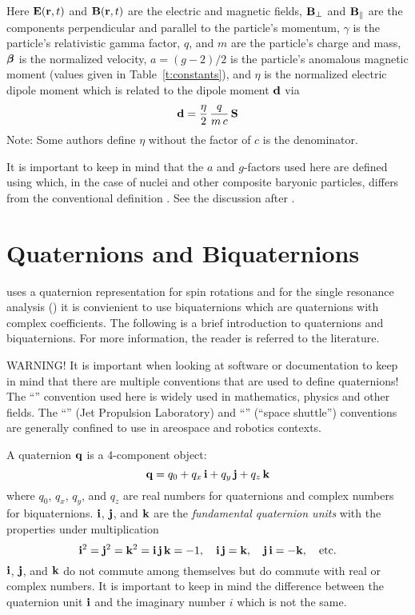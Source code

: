 Here ${\bf E} ({\bf r} ,t)$ and ${\bf B} ({\bf r} ,t)$ are the electric and magnetic fields, ${\bf B}_\perp$
and ${\bf B}_\parallel$ are the components perpendicular and parallel to the particle's momentum,
$\gamma$ is the particle's relativistic gamma factor, $q$, and $m$ are the particle's charge and
mass, $\boldsymbol{\beta}$ is the normalized velocity, $a = (g-2)/2$ is the particle's anomalous magnetic
moment (values given in Table~\ref{t:constants}), and $\eta$ is the normalized electric dipole
moment which is related to the dipole moment ${\bf d}$ via
\begin{equation}
  {\bf d} = \frac{\eta}{2} \, \frac{q}{m \, c} \, {\bf S}
\end{equation}
Note: Some authors define $\eta$ without the factor of $c$ is the denominator.

It is important to keep in mind that the $a$ and $g$-factors used here are defined using 
which, in the case of nuclei and other composite baryonic particles, differs from the conventional
definition . See the discussion after .

\section{Quaternions and Biquaternions}
\label{s:quat}

\bmad uses a quaternion representation for spin rotations\cite{b:quat} and for the single resonance
analysis () it is convienient to use biquaternions which are quaternions with
complex coefficients. The following is a brief introduction to quaternions and biquaternions. For
more information, the reader is referred to the literature\cite{b:biquat}.

WARNING! It is important when looking at software or documentation to keep in mind that there are
multiple conventions that are used to define quaternions! The ``'' convention used here
is widely used in mathematics, physics and other fields. The ``'' (Jet Propulsion
Laboratory) and ``'' (``space shuttle'') conventions are generally confined to use in
areospace and robotics contexts\cite{b:yazell,b:sommer}.

A quaternion ${\bf q}$ is a 4-component object:
\begin{equation}
  {\bf q} = q_0 + q_x \, {\bf i} + q_y \, {\bf j} + q_z \, {\bf k}
  \label{qqqqq}
\end{equation}
where $q_0$, $q_x$, $q_y$, and $q_z$ are real numbers for quaternions and complex numbers for
biquaternions. ${\bf i}$, ${\bf j}$, and ${\bf k}$ are the {\em fundamental quaternion units} with the
properties under multiplication
\begin{equation}
  {\bf i}^2 = {\bf j}^2 = {\bf k}^2 = {\bf i} \, {\bf j} \, {\bf k} = -1, \quad 
  {\bf i} \, {\bf j} = {\bf k}, \quad {\bf j} \, {\bf i} = -{\bf k}, \quad \text{etc.}
\end{equation}
${\bf i}$, ${\bf j}$, and ${\bf k}$ do not commute among themselves but do commute with real or complex
numbers. It is important to keep in mind the difference between the quaternion unit ${\bf i}$
and the imaginary number $i$ which is not the same.

